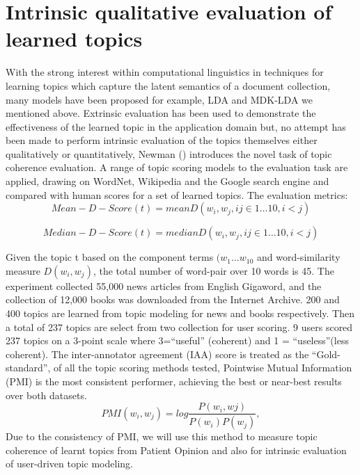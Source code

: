 \documentclass[11pt,twoside]{report}
\begin{document}
\section{Intrinsic qualitative evaluation of learned topics}
With the strong interest within computational linguistics in techniques for learning topics which capture the latent semantics of a document collection, many models have been proposed for example, LDA and MDK-LDA we mentioned above. Extrinsic evaluation has been used to demonstrate the effectiveness of the learned topic in the application domain but, no attempt has been made to perform intrinsic evaluation of the topics themselves either qualitatively or quantitatively, Newman (\cite{ref27}) introduces the novel task of topic coherence evaluation. A range of topic scoring models to the evaluation task are applied, drawing on WordNet, Wikipedia and the Google search engine and compared with human scores for a set of learned topics. The evaluation metrics:
\begin{equation}
Mean-D-Score(t) =  mean{D(w_{i}, w_{j}, ij\in 1…10, i<j)}
\end{equation}

\begin{equation}
Median-D-Score(t) =  median{D(w_{i}, w_{j}, ij\in 1…10, i<j)}
\end{equation}

Given the topic t based on the component terms $(w_{1}…w_{10}$ and word-similarity measure $D(w_{i}, w_{j})$, the total number of word-pair over 10 words is 45. The experiment collected 55,000 news articles from English Gigaword, and the collection of 12,000 books was downloaded from the Internet Archive. 200 and 400 topics are learned from topic modeling for news and books respectively. Then a total of 237 topics are select from two collection for user scoring. 9 users scored 237 topics on a 3-point scale where 3=``useful'' (coherent) and 1 = ``useless''(less coherent). The inter-annotator agreement (IAA) score is treated as the ``Gold-standard'', of all the topic scoring methods tested, Pointwise Mutual Information (PMI) is the most consistent performer, achieving the best or near-best results over both datasets. 
\begin{equation}
PMI(w_{i}, w_{j}) = log \frac{P(w_{i}, w{j})}{P(w_{i})P(w_{j})},
\end{equation}
Due to the consistency of PMI, we will use this method to measure topic coherence of learnt topics from Patient Opinion and also for intrinsic evaluation of user-driven topic modeling.
\end{document}
